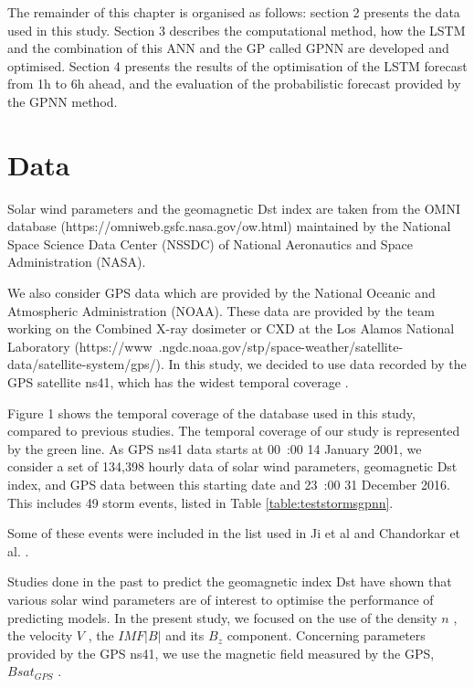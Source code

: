 The remainder of this chapter is organised as follows: section 2 presents the data used in this study. 
Section 3 describes the computational method, how the LSTM and the combination of this ANN and the GP called 
GPNN are developed and optimised. Section 4 presents the results of the optimisation of the LSTM forecast 
from 1h to 6h ahead, and the evaluation of the probabilistic forecast provided by the GPNN method. 

\section{Data}

Solar wind parameters and the geomagnetic Dst index are taken from the OMNI database 
(https://omniweb.gsfc.nasa.gov/ow.html) maintained by the National Space Science Data Center (NSSDC) 
of National Aeronautics and Space Administration (NASA).

We also consider GPS data which are provided by the National Oceanic and Atmospheric Administration (NOAA). 
These data are provided by the team working on the Combined X-ray dosimeter or CXD at the 
Los Alamos National Laboratory (https://www .ngdc.noaa.gov/stp/space-weather/satellite-data/satellite-system/gps/). 
In this study, we decided to use data recorded by the GPS satellite ns41, which has the widest temporal coverage 
\cite{morley2017energetic}. 

Figure 1 shows the temporal coverage of the database used in this study, compared to previous studies. 
The temporal coverage of our study is represented by the green line. As GPS ns41 data starts at 
00 :00 14 January 2001, we consider a set of 134,398 hourly data of solar wind parameters, geomagnetic Dst index, 
and GPS data between this starting date and 23 :00 31 December 2016. This includes 49 storm events, listed in 
Table \ref{table:teststormsgpnn}. 

Some of these events were included in the list used in Ji et al \cite{Ji2012} and 
Chandorkar et al. \cite{ChandorkarDst}. 

Studies done in the past to predict the geomagnetic index Dst have shown that various solar wind parameters 
are of interest to optimise the performance of predicting models. In the present study, we focused on the use 
of the density  \( n \) , the velocity  \( V \) , the  \( IMF \vert B \vert  \) and its  \( B_{z} \)  component. 
Concerning parameters provided by the GPS ns41, we use the magnetic field measured by the GPS,  \( Bsat_{GPS} \) .

